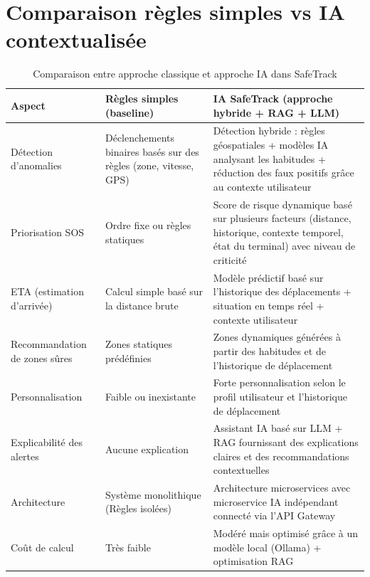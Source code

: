 \section{Comparaison règles simples vs IA contextualisée}
\begin{table}[H]
\centering
\renewcommand{\arraystretch}{1.4}
\begin{tabular}{|p{4cm}|p{5.5cm}|p{5.5cm}|}
\hline
\textbf{Aspect} & \textbf{Règles simples (baseline)} & \textbf{IA SafeTrack (approche hybride + RAG + LLM)} \\
\hline

Détection d’anomalies 
& Déclenchements binaires basés sur des règles (zone, vitesse, GPS) 
& Détection hybride : règles géospatiales + modèles IA analysant les habitudes + réduction des faux positifs grâce au contexte utilisateur \\
\hline

Priorisation SOS 
& Ordre fixe ou règles statiques 
& Score de risque dynamique basé sur plusieurs facteurs (distance, historique, contexte temporel, état du terminal) avec niveau de criticité \\
\hline

ETA (estimation d’arrivée) 
& Calcul simple basé sur la distance brute 
& Modèle prédictif basé sur l’historique des déplacements + situation en temps réel + contexte utilisateur \\
\hline

Recommandation de zones sûres 
& Zones statiques prédéfinies 
& Zones dynamiques générées à partir des habitudes et de l'historique de déplacement \\
\hline

Personnalisation 
& Faible ou inexistante 
& Forte personnalisation selon le profil utilisateur et l’historique de déplacement \\
\hline

Explicabilité des alertes 
& Aucune explication 
& Assistant IA basé sur LLM + RAG fournissant des explications claires et des recommandations contextuelles \\
\hline

Architecture 
& Système monolithique (Règles isolées)
& Architecture microservices avec microservice IA indépendant connecté via l’API Gateway \\
\hline

Coût de calcul 
& Très faible 
& Modéré mais optimisé grâce à un modèle local (Ollama) + optimisation RAG \\
\hline

\end{tabular}
\caption{Comparaison entre approche classique et approche IA dans SafeTrack}
\end{table}

